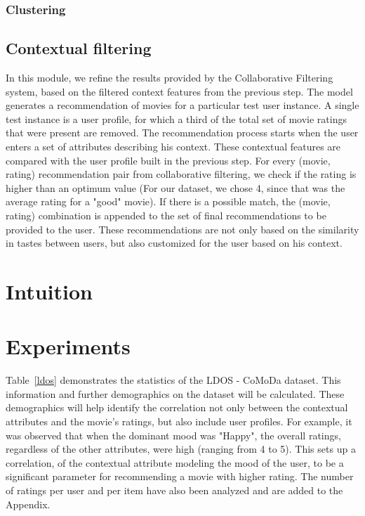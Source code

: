 \documentclass{article}
\begin{document}
\subsubsection{Clustering}


\subsection{Contextual filtering}
In this module, we refine the results provided by the Collaborative Filtering system, based on the filtered context features from the previous step. The model generates a recommendation of movies for a particular test user instance. A single test instance is a user profile, for which a third of the total set of movie ratings that were present are removed. The recommendation process starts when the user enters a set of attributes describing his context. These contextual features are compared with the user profile built in the previous step. For every (movie, rating) recommendation pair from collaborative filtering, we check if the rating is higher than an optimum value (For our dataset, we chose 4, since that was the average rating for a "good" movie). If there is a possible match, the (movie, rating) combination is appended to the set of final recommendations to be provided to the user. These recommendations are not only based on the similarity in tastes between users, but also customized for the user based on his context.

\section{Intuition}

\section{Experiments}
Table~\ref{ldos} demonstrates the statistics of the LDOS - CoMoDa dataset. This information and further demographics on the dataset will be calculated. These demographics will help identify the correlation not only between the contextual attributes and the movie's ratings, but also include user profiles. For example, it was observed that when the dominant mood was "Happy", the overall ratings, regardless of the other attributes, were high (ranging from 4 to 5). This sets up a correlation, of the contextual attribute modeling the mood of the user, to be a significant parameter for recommending a movie with higher rating. The number of ratings per user and per item have also been analyzed and are added to the Appendix.
\end{document}
